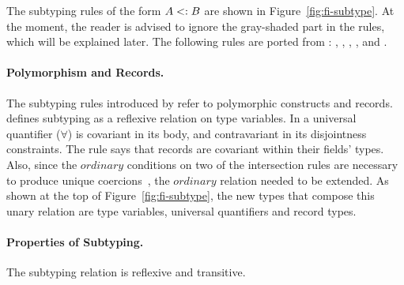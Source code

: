 The subtyping rules of the form $A <: B$ are shown in 
Figure~\ref{fig:fi-subtype}. 
At the moment, the reader is advised to ignore the
gray-shaded part in the rules, which will be explained later. 
The following rules are ported from \oldname: , 
,
, ,  and
.


\paragraph{Polymorphism and Records.}
The subtyping rules introduced by \name refer to polymorphic constructs and records. 
 defines subtyping as a reflexive relation on type variables.
In  a universal quantifier ($\forall$) 
is covariant in its body, and contravariant in its disjointness constraints.
The  rule says that records are covariant within their fields' types.
Also, since the $ordinary$ conditions on two of the intersection rules are necessary to 
produce unique coercions~\cite{icfppaper}, the $ordinary$ relation needed to be extended.
As shown at the top of Figure~\ref{fig:fi-subtype}, the new types that compose this unary 
relation are type variables, universal quantifiers and record types.

\paragraph{Properties of Subtyping.} The subtyping relation is reflexive and transitive.

